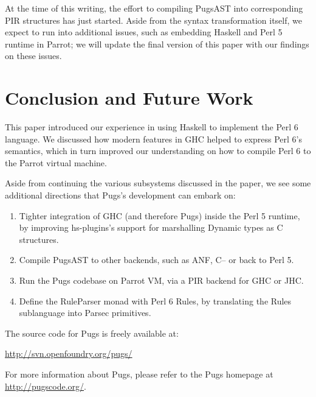 \documentclass[]{sigplanconf}
\begin{document}
At the time of this writing, the effort to compiling PugsAST into corresponding
PIR structures has just started.  Aside from the syntax transformation itself,
we expect to run into additional issues, such as embedding Haskell and Perl 5
runtime in Parrot; we will update the final version of this paper with our
findings on these issues.

\section{Conclusion and Future Work}
\label{sec:ConclusionandFutureWork}

This paper introduced our experience in using Haskell to implement the Perl 6
language.  We discussed how modern features in GHC helped to express Perl 6's
semantics, which in turn improved our understanding on how to compile Perl 6
to the Parrot virtual machine.

Aside from continuing the various subsystems discussed in the paper, we see
some additional directions that Pugs's development can embark on: 

\begin{enumerate}
\item Tighter integration of GHC (and therefore Pugs) inside the Perl 5
runtime, by improving hs-plugins's support for marshalling Dynamic types as
C structures.
\item Compile PugsAST to other backends, such as ANF, C-- or back to Perl 5.
\item Run the Pugs codebase on Parrot VM, via a PIR backend for GHC or JHC.
\item Define the RuleParser monad with Perl 6 Rules, by translating the Rules
sublanguage into Parsec primitives.
\end{enumerate}

The source code for Pugs is freely available at:

\begin{center}
\url{http://svn.openfoundry.org/pugs/}
\end{center}

For more information about Pugs, please refer to the Pugs homepage at
\url{http://pugscode.org/}.



\acks
\end{document}
